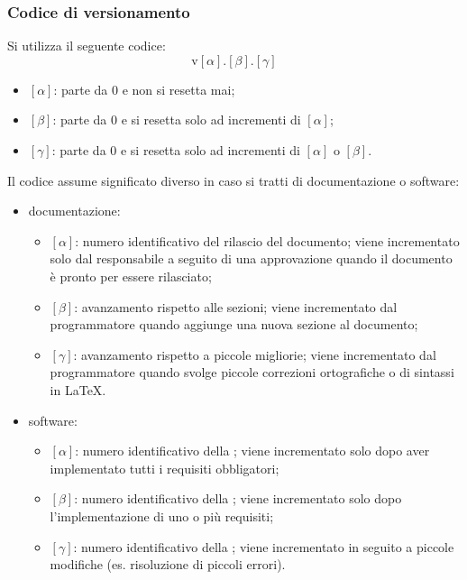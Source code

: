     \subsubsection{Codice di versionamento}
    Si utilizza il seguente codice:
    \[
        \text{v}[\alpha].[\beta].[\gamma]
    \]
    \begin{itemize}
        \item \([\alpha]\): parte da 0 e non si resetta mai;
        \item \([\beta]\): parte da 0 e si resetta solo ad incrementi di \([\alpha]\);
        \item \([\gamma]\): parte da 0 e si resetta solo ad incrementi di \([\alpha]\) o \([\beta]\).
    \end{itemize}
    Il codice assume significato diverso in caso si tratti di documentazione o software:
    \begin{itemize}
        \item documentazione:
        \begin{itemize}
            \item \([\alpha]\): numero identificativo del rilascio del documento; viene incrementato solo dal responsabile a seguito di una approvazione quando il documento è pronto per essere rilasciato;
            \item \([\beta]\): avanzamento rispetto alle sezioni; viene incrementato dal programmatore quando aggiunge una nuova sezione al documento;
            \item \([\gamma]\): avanzamento rispetto a piccole migliorie; viene incrementato dal programmatore quando svolge piccole correzioni ortografiche o di sintassi in \LaTeX.
        \end{itemize}

        \item software:
        \begin{itemize}
            \item \([\alpha]\): numero identificativo della ; viene incrementato solo dopo aver implementato tutti i requisiti obbligatori;
            \item \([\beta]\): numero identificativo della ; viene incrementato solo dopo l'implementazione di uno o più requisiti;
            \item \([\gamma]\): numero identificativo della ; viene incrementato in seguito a piccole modifiche (es. risoluzione di piccoli errori).
            \end{itemize}
    \end{itemize}


